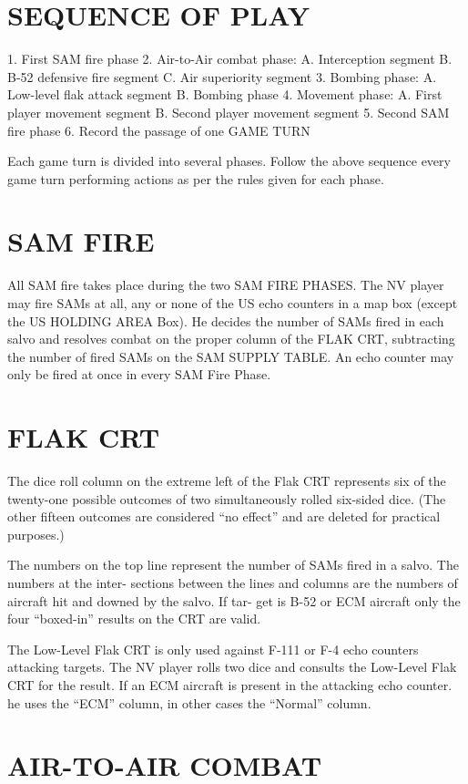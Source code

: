 \section*{SEQUENCE OF PLAY}
1. First SAM fire phase
2. Air-to-Air combat phase:
   A. Interception segment
   B. B-52 defensive fire segment
   C. Air superiority segment
3. Bombing phase:
   A. Low-level flak attack segment
   B. Bombing phase
4. Movement phase:
   A. First player movement segment
   B. Second player movement segment
5. Second SAM fire phase
6. Record the passage of one GAME TURN

Each game turn is divided into
several phases. Follow the above
sequence every game turn performing
actions as per the rules given for each
phase.

\section*{SAM FIRE}
All SAM fire takes place during the
two SAM FIRE PHASES. The NV
player may fire SAMs at all, any or
none of the US echo counters in a map
box (except the US HOLDING AREA
Box). He decides the number of SAMs
fired in each salvo and resolves
combat on the proper column of the
FLAK CRT, subtracting the number
of fired SAMs on the SAM SUPPLY
TABLE.
An echo counter may only be fired
at once in every SAM Fire Phase.
\section*{FLAK CRT}

The dice roll column on the extreme
left of the Flak CRT represents six of
the twenty-one possible outcomes of
two simultaneously rolled six-sided
dice. (The other fifteen outcomes are
considered ``no effect'' and are
deleted for practical purposes.)

The numbers on the top line
represent the number of SAMs fired
in a salvo. The numbers at the inter-
sections between the lines and
columns are the numbers of aircraft
hit and downed by the salvo. If tar-
get is B-52 or ECM aircraft only the
four ``boxed-in'' results on the CRT
are valid.

The Low-Level Flak CRT is only
used against F-111 or F-4 echo
counters attacking targets. The NV
player rolls two dice and consults the
Low-Level Flak CRT for the result. If
an ECM aircraft is present in the
attacking echo counter. he uses the
``ECM'' column, in other cases the
``Normal'' column.

\section*{AIR-TO-AIR COMBAT}

